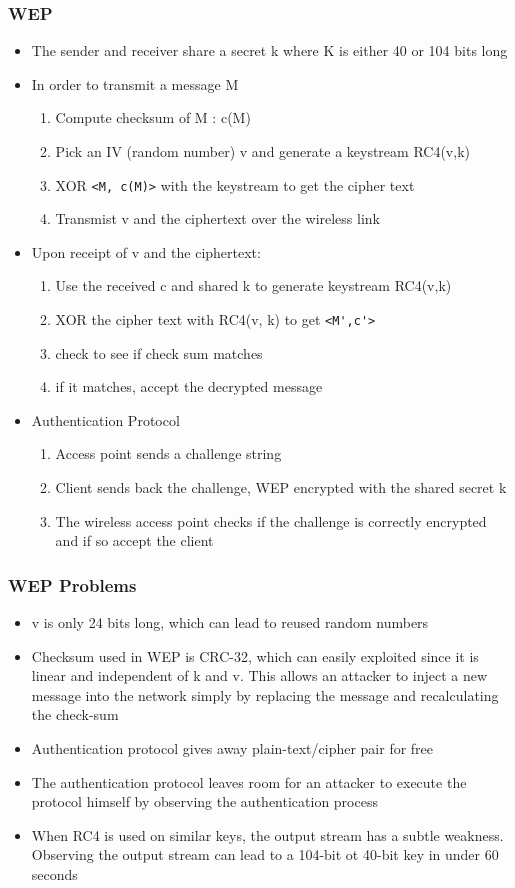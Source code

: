 \documentclass[twoside]{article}
\begin{document}
\subsubsection{WEP}
\begin{itemize}
\item The sender and receiver share  a secret k where K is either 40 or 104 bits long
\item In order to transmit a message M 
\begin{enumerate}
\item Compute checksum of M : c(M)
\item Pick an IV (random number) v and generate a keystream RC4(v,k)
\item XOR \verb|<M, c(M)>| with the keystream to get the cipher text
\item Transmist v and the ciphertext over the wireless link
\end{enumerate}
\item Upon receipt of v and the ciphertext:
\begin{enumerate}
\item Use the received c and shared k to generate keystream RC4(v,k)
\item XOR the cipher text with RC4(v, k) to get \verb|<M',c'>| 
\item check to see if check sum matches
\item if it matches, accept the decrypted message
\end{enumerate}
\item Authentication Protocol
\begin{enumerate}
\item Access point sends a challenge string
\item Client sends back the challenge, WEP encrypted with the shared secret k
\item The wireless access point checks if the challenge is correctly encrypted and if so accept the client
\end{enumerate}
\end{itemize}

\subsubsection{WEP Problems}
\begin{itemize}
\item v is only 24 bits long, which can lead to reused random numbers
\item Checksum used in WEP is CRC-32, which can easily exploited since it is linear and independent of k and v. This allows an attacker to inject a new message into the network simply by replacing the message and recalculating the check-sum
\item Authentication protocol gives away plain-text/cipher pair for free
\item The authentication protocol leaves room for an attacker to execute the protocol himself by observing the authentication process
\item When RC4 is used on similar keys, the output stream has a subtle weakness. Observing the output stream can lead to a 104-bit ot 40-bit key in under 60 seconds
\end{itemize}
\end{document}
